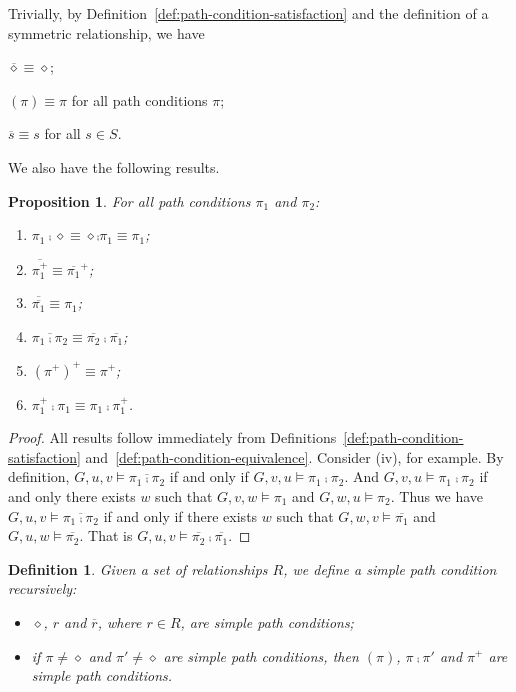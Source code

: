 \documentclass{article}
\newtheorem{definition}{Definition}
\newtheorem{proposition}{Proposition}
\begin{document}
Trivially, by Definition~\ref{def:path-condition-satisfaction} and the definition of a symmetric relationship, we have
\begin{inparaenum}[(i)]
   \item $\overline{\diamond} \equiv \diamond$;
    \item $(\pi) \equiv \pi$ for all path conditions $\pi$;
   \item $\overline{s} \equiv s$ for all $s \in S$.
\end{inparaenum}
We also have the following results.

\begin{proposition}\label{pro:simple-equivalences}For all path conditions $\pi_1$ and $\pi_2$:
\begin{enumerate}[\em (i)]
        \item $\pi_1 \comp \diamond \equiv \diamond \comp \pi_1 \equiv \pi_1$;
        \item $\overline{\pi_1^+} \equiv \overline{\pi_1}^+$;
        \item $\overline{\overline{\pi_1}} \equiv \pi_1$;
        \item $\overline{\pi_1 \comp \pi_2} \equiv \overline{\pi_2} \comp \overline{\pi_1}$;
        \item $(\pi^+)^+ \equiv \pi^+$;
        \item $\pi_1^+ \comp \pi_1 \equiv \pi_1 \comp \pi_1^+$.
\end{enumerate}
\end{proposition}

\begin{proof}
    All results follow immediately from Definitions~\ref{def:path-condition-satisfaction} and~\ref{def:path-condition-equivalence}.
    Consider (iv), for example.
    By definition, $G,u,v \models \overline{\pi_1 \comp \pi_2}$ if and only if $G,v,u \models \pi_1 \comp \pi_2$.
    And $G,v,u \models \pi_1 \comp \pi_2$ if and only there exists $w$ such that $G,v,w \models \pi_1$ and $G,w,u \models \pi_2$.
    Thus we have $G,u,v \models \overline{\pi_1 \comp \pi_2}$ if and only if there exists $w$ such that $G,w,v \models \overline{\pi_1}$ and $G,u,w \models \overline{\pi_2}$.
    That is $G,u,v \models \overline{\pi_2} \comp \overline{\pi_1}$.
\end{proof}

\begin{definition}\label{def:simple-path-condition}Given a set of relationships $R$, we define a \emph{simple path condition} recursively:
    \begin{itemize}
        \item $\diamond$, $r$ and $\overline{r}$, where $r \in R$, are simple path conditions;
        \item if $\pi \ne \diamond$ and $\pi' \ne \diamond$ are simple path conditions, then $(\pi)$, $\pi \comp \pi'$ and $\pi^+$ are simple path conditions.
    \end{itemize}
\end{definition}
\end{document}
